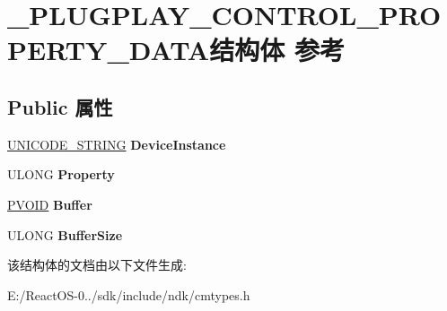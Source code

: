 \hypertarget{struct___p_l_u_g_p_l_a_y___c_o_n_t_r_o_l___p_r_o_p_e_r_t_y___d_a_t_a}{}\section{\+\_\+\+P\+L\+U\+G\+P\+L\+A\+Y\+\_\+\+C\+O\+N\+T\+R\+O\+L\+\_\+\+P\+R\+O\+P\+E\+R\+T\+Y\+\_\+\+D\+A\+T\+A结构体 参考}
\label{struct___p_l_u_g_p_l_a_y___c_o_n_t_r_o_l___p_r_o_p_e_r_t_y___d_a_t_a}
\subsection*{Public 属性}
\begin{DoxyCompactItemize}
\item 
\mbox{\label{struct___p_l_u_g_p_l_a_y___c_o_n_t_r_o_l___p_r_o_p_e_r_t_y___d_a_t_a_a9002d4a244e94a765265607f8a6ce2f6}} 
\hyperlink{struct___u_n_i_c_o_d_e___s_t_r_i_n_g}{U\+N\+I\+C\+O\+D\+E\+\_\+\+S\+T\+R\+I\+NG} {\bfseries Device\+Instance}
\item 
\mbox{\label{struct___p_l_u_g_p_l_a_y___c_o_n_t_r_o_l___p_r_o_p_e_r_t_y___d_a_t_a_ad2e5c4d0d81a7622b8d7ea0e98b82be5}} 
U\+L\+O\+NG {\bfseries Property}
\item 
\mbox{\label{struct___p_l_u_g_p_l_a_y___c_o_n_t_r_o_l___p_r_o_p_e_r_t_y___d_a_t_a_aba27965364540c908ae589a6eb1f051b}} 
\hyperlink{interfacevoid}{P\+V\+O\+ID} {\bfseries Buffer}
\item 
\mbox{\label{struct___p_l_u_g_p_l_a_y___c_o_n_t_r_o_l___p_r_o_p_e_r_t_y___d_a_t_a_abbf42b03b0036a9486c6c34d00130341}} 
U\+L\+O\+NG {\bfseries Buffer\+Size}
\end{DoxyCompactItemize}


该结构体的文档由以下文件生成\+:\begin{DoxyCompactItemize}
\item 
E\+:/\+React\+O\+S-\/0../sdk/include/ndk/cmtypes.\+h\end{DoxyCompactItemize}
